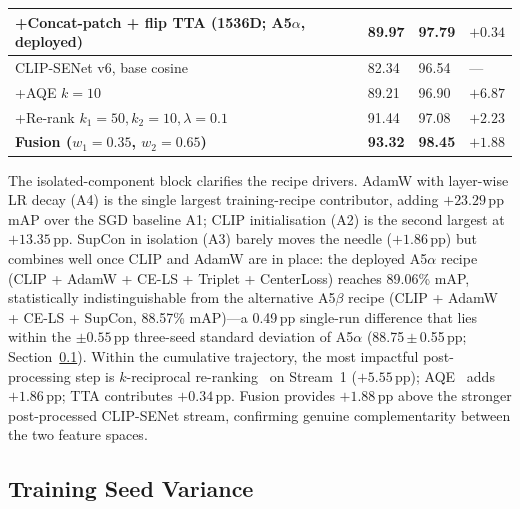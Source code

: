 \documentclass[11pt]{article}
\begin{document}
\begin{table}[!t]
\begin{tabular}{L{4.2cm}C{1.1cm}C{1.0cm}C{1.2cm}}
    \quad+Concat-patch + flip TTA (1536D; A5$\alpha$, deployed) & 89.97 & 97.79 & $+0.34$ \\
    \midrule
    CLIP-SENet v6, base cosine~\cite{lu2025clipsenet}    & 82.34 & 96.54 & --- \\
    \quad+AQE $k{=}10$                                   & 89.21 & 96.90 & $+6.87$ \\
    \quad+Re-rank $k_1{=}50,k_2{=}10,\lambda{=}0.1$     & 91.44 & 97.08 & $+2.23$ \\
    \midrule
    \textbf{Fusion ($w_1{=}0.35$, $w_2{=}0.65$)}        & \textbf{93.32} & \textbf{98.45} & $+1.88$ \\
    \bottomrule
  \end{tabular}
\end{table}

The isolated-component block clarifies the recipe drivers. AdamW with
layer-wise LR decay (A4) is the single largest training-recipe contributor,
adding $+23.29$\,pp mAP over the SGD baseline A1; CLIP initialisation (A2)
is the second largest at $+13.35$\,pp. SupCon in isolation (A3) barely
moves the needle ($+1.86$\,pp) but combines well once CLIP and AdamW are in
place: the deployed A5$\alpha$ recipe (CLIP + AdamW + CE-LS + Triplet +
CenterLoss) reaches 89.06\% mAP, statistically indistinguishable from the
alternative A5$\beta$ recipe (CLIP + AdamW + CE-LS + SupCon,
88.57\% mAP)---a 0.49\,pp single-run difference that lies within the
$\pm 0.55$\,pp three-seed standard deviation of A5$\alpha$
(88.75\,$\pm$\,0.55\,pp; Section~\ref{sec:seed_variance}).
Within the cumulative trajectory, the most impactful post-processing step
is $k$-reciprocal re-ranking~\cite{zhong2017rerank} on Stream~1
($+5.55$\,pp); AQE~\cite{arandjelovic2012aqe} adds $+1.86$\,pp; TTA
contributes $+0.34$\,pp. Fusion provides $+1.88$\,pp above the stronger
post-processed CLIP-SENet stream, confirming genuine complementarity
between the two feature spaces.

\subsection{Training Seed Variance}
\label{sec:seed_variance}
\end{document}
